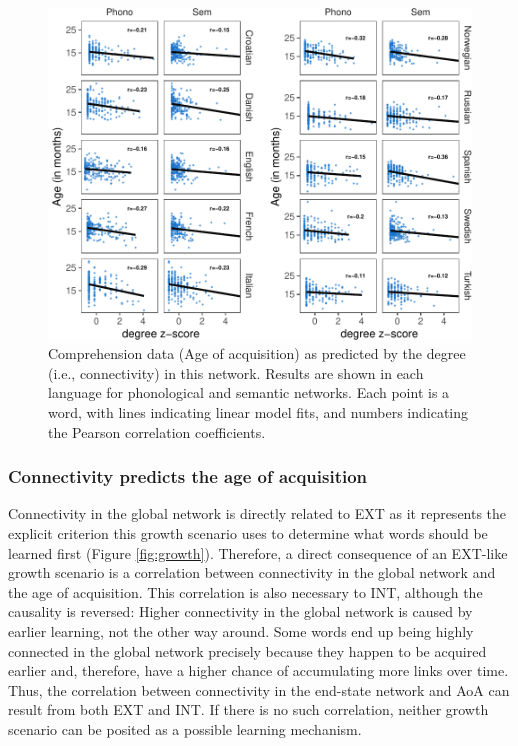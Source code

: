 \documentclass[english,,man,floatsintext]{apa6}
\begin{document}
\begin{figure}[!h]
\includegraphics[width=\textwidth]{ms_files/figure-latex/corrComp-1} \caption{Comprehension data (Age of acquisition) as predicted by the degree (i.e., connectivity) in this network. Results are shown in each language for phonological and semantic networks. Each point is a word, with lines indicating linear model fits, and numbers indicating the Pearson correlation coefficients.}\label{fig:corrComp}
\end{figure}

\hypertarget{connectivity-predicts-the-age-of-acquisition}{%
\subsubsection{Connectivity predicts the age of acquisition}\label{connectivity-predicts-the-age-of-acquisition}}

Connectivity in the global network is directly related to EXT as it represents the explicit criterion this growth scenario uses to determine what words should be learned first (Figure \ref{fig:growth}). Therefore, a direct consequence of an EXT-like growth scenario is a correlation between connectivity in the global network and the age of acquisition. This correlation is also necessary to INT, although the causality is reversed: Higher connectivity in the global network is caused by earlier learning, not the other way around. Some words end up being highly connected in the global network precisely because they happen to be acquired earlier and, therefore, have a higher chance of accumulating more links over time. Thus, the correlation between connectivity in the end-state network and AoA can result from both EXT and INT. If there is no such correlation, neither growth scenario can be posited as a possible learning mechanism.
\end{document}
